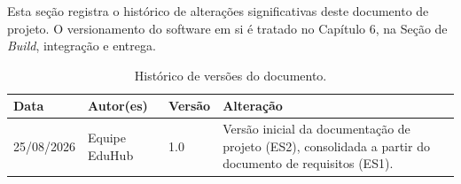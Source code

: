 Esta seção registra o histórico de alterações significativas deste
documento de projeto. O versionamento do software em si é tratado no
Capítulo 6, na Seção de \textit{Build}, integração e entrega.

\begin{table}[ht]
\centering
\caption{Histórico de versões do documento.}
\begin{tabularx}{0.95\textwidth}{p{} p{} p{} X}
\toprule
\textbf{Data} & \textbf{Autor(es)} & \textbf{Versão} & \textbf{Alteração} \\
\midrule
25/08/2026 & Equipe EduHub & 1.0 & Versão inicial da documentação de projeto (ES2), consolidada a partir do documento de requisitos (ES1). \\
\bottomrule
\end{tabularx}
\end{table}
